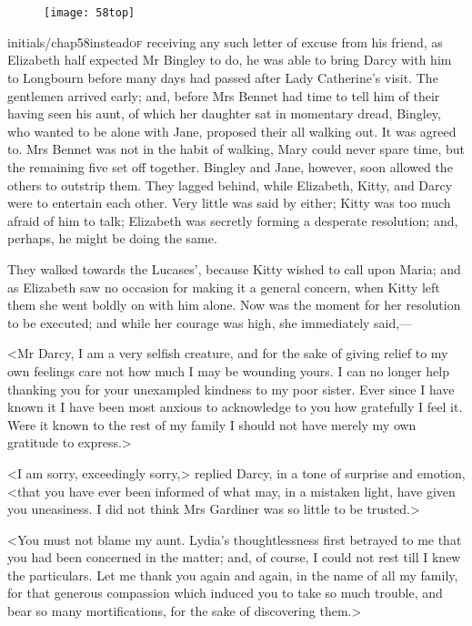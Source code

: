 \chapter[Chapter \thechapter]{}
	
	
\begin{figure}[t!]
\centering
\texttt{[image: 58top]}
\end{figure}


\lettrine[lines=6,image=true,findent=2pt]{initials/chap58instead}{of} receiving any such letter of excuse from his friend, as Elizabeth half expected Mr Bingley to do, he was able to bring Darcy with him to Longbourn before many days had passed after Lady Catherine's visit. The gentlemen arrived early; and, before Mrs Bennet had time to tell him of their having seen his aunt, of which her daughter sat in momentary dread, Bingley, who wanted to be alone with Jane, proposed their all walking out. It was agreed to. Mrs Bennet was not in the habit of walking, Mary could never spare time, but the remaining five set off together. Bingley and Jane, however, soon allowed the others to outstrip them. They lagged behind, while Elizabeth, Kitty, and Darcy were to entertain each other. Very little was said by either; Kitty was too much afraid of him to talk; Elizabeth was secretly forming a desperate resolution; and, perhaps, he might be doing the same.

They walked towards the Lucases', because Kitty wished to call upon Maria; and as Elizabeth saw no occasion for making it a general concern, when Kitty left them she went boldly on with him alone. Now was the moment for her resolution to be executed; and while her courage was high, she immediately said,—

<Mr Darcy, I am a very selfish creature, and for the sake of giving relief to my own feelings care not how much I may be wounding yours. I can no longer help thanking you for your unexampled kindness to my poor sister. Ever since I have known it I have been most anxious to acknowledge to you how gratefully I feel it. Were it known to the rest of my family I should not have merely my own gratitude to express.>

<I am sorry, exceedingly sorry,> replied Darcy, in a tone of surprise and emotion, <that you have ever been informed of what may, in a mistaken light, have given you uneasiness. I did not think Mrs Gardiner was so little to be trusted.>

<You must not blame my aunt. Lydia's thoughtlessness first betrayed to me that you had been concerned in the matter; and, of course, I could not rest till I knew the particulars. Let me thank you again and again, in the name of all my family, for that generous compassion which induced you to take so much trouble, and bear so many mortifications, for the sake of discovering them.>

